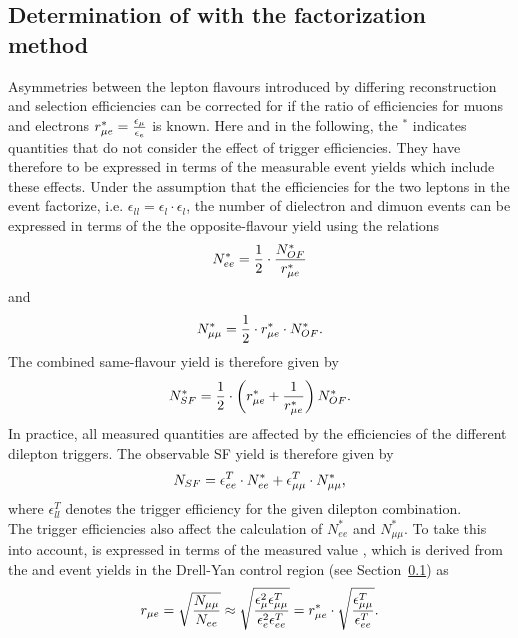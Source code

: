 

\subsection{Determination of \Rsfof with the factorization method}
\label{sec:rmue}
Asymmetries between the lepton flavours introduced by differing reconstruction and selection efficiencies can be corrected for if the ratio of efficiencies for muons and electrons $r_{\mu e}^{*} = \frac{\epsilon_{\mu}}{\epsilon_{e}}$ is known. Here and in the following, the $^{*}$ indicates quantities that do not consider the effect of trigger efficiencies. They have therefore to be expressed in terms of the measurable event yields which include these effects. Under the assumption that the efficiencies for the two leptons in the event factorize, i.e. $\epsilon_{ll} = \epsilon_{l}\cdot\epsilon_{l}$, the number of dielectron and dimuon events can be expressed in terms of the the opposite-flavour yield using the relations
\begin{equation}
N_{ee}^{*} = \frac{1}{2}\cdot \frac{N_{OF}^{*}}{r_{\mu e}^{*}}
\end{equation}
and 
\begin{equation}
N_{\mu\mu}^{*} = \frac{1}{2} \cdot r_{\mu e}^{*} \cdot N_{OF}^{*}.
\end{equation}
The combined same-flavour yield is therefore given by
\begin{equation}
N_{SF}^{*} = \frac{1}{2}\cdot \left( r_{\mu e}^{*} + \frac{1}{r_{\mu e}^{*}} \right) N_{OF}^{*}.
\end{equation}
In practice, all measured quantities are affected by the efficiencies of the different dilepton triggers. The observable SF yield is therefore given by
\begin{equation}
N_{SF} = \epsilon_{ee}^T \cdot N_{ee}^{*} + \epsilon_{\mu\mu}^T \cdot N_{\mu\mu}^{*},
\end{equation}
where $\epsilon_{ll}^T$ denotes the trigger efficiency for the given dilepton combination.\\
The trigger efficiencies also affect the calculation of $N_{ee}^{*}$ and $N_{\mu\mu}^{*}$. To take this into account, \rmuestar is expressed in terms of the measured value \rmue, which is derived from the \EE and \MM event yields in the Drell-Yan control region (see Section~\ref{sec:rmue}) as 
\begin{equation}
r_{\mu e}  = \sqrt{\frac{N_{\mu\mu}}{N_{ee}}} \approx \sqrt{\frac{\epsilon_{\mu}^2 \epsilon_{\mu\mu}^T}{\epsilon_{e}^2 \epsilon_{ee}^T}} = r_{\mu e}^{*} \cdot \sqrt{\frac{\epsilon_{\mu\mu}^T}{\epsilon_{ee}^T}}.
\end{equation}
